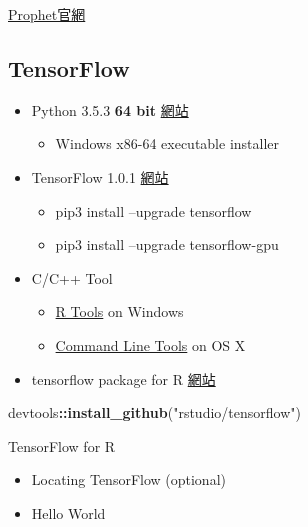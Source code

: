 \documentclass[
]{book}
\newenvironment{Shaded}{\begin{snugshade}}{\end{snugshade}}
\newcommand{\KeywordTok}[1]{\textcolor[rgb]{0.13,0.29,0.53}{\textbf{#1}}}
\newcommand{\NormalTok}[1]{#1}
\newcommand{\OperatorTok}[1]{\textcolor[rgb]{0.81,0.36,0.00}{\textbf{#1}}}
\newcommand{\StringTok}[1]{\textcolor[rgb]{0.31,0.60,0.02}{#1}}
\providecommand{\tightlist}{%
  \setlength{\itemsep}{0pt}\setlength{\parskip}{0pt}}
\begin{document}
\href{https://facebookincubator.github.io/prophet/}{Prophet官網}

\hypertarget{tensorflow}{%
\subsection{TensorFlow}\label{tensorflow}}

\begin{itemize}
\tightlist
\item
  Python 3.5.3 \textbf{64 bit} \href{https://www.python.org/downloads/release/python-353/}{網站}

  \begin{itemize}
  \tightlist
  \item
    Windows x86-64 executable installer
  \end{itemize}
\item
  TensorFlow 1.0.1 \href{https://www.tensorflow.org/install/}{網站}

  \begin{itemize}
  \tightlist
  \item
    pip3 install --upgrade tensorflow
  \item
    pip3 install --upgrade tensorflow-gpu
  \end{itemize}
\item
  C/C++ Tool

  \begin{itemize}
  \tightlist
  \item
    \href{https://cran.r-project.org/bin/windows/Rtools/}{R Tools} on Windows
  \item
    \href{http://osxdaily.com/2014/02/12/install-command-line-tools-mac-os-x/}{Command Line Tools} on OS X
  \end{itemize}
\item
  tensorflow package for R \href{https://rstudio.github.io/tensorflow/index.html}{網站}
\end{itemize}

\begin{Shaded}
\begin{Highlighting}[]
\NormalTok{devtools}\OperatorTok{::}\KeywordTok{install_github}\NormalTok{(}\StringTok{"rstudio/tensorflow"}\NormalTok{)}
\end{Highlighting}
\end{Shaded}

TensorFlow for R

\begin{itemize}
\tightlist
\item
  Locating TensorFlow (optional)
\item
  Hello World
\end{itemize}
\end{document}
